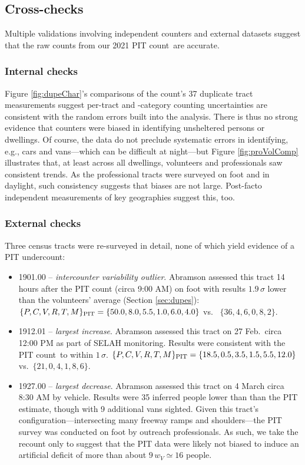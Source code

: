 \documentclass[11pt,twocolumn]{article}
\def\Count{count}
\begin{document}
\subsection{Cross-checks}
\label{sec:crossChecks}

Multiple validations involving independent counters and external datasets suggest 
that the raw counts from our 2021 PIT \Count\ are accurate.

\subsubsection{Internal checks}

Figure \ref{fig:dupeChar}'s comparisons of the count's 37 duplicate tract measurements suggest 
per-tract and -category counting uncertainties are consistent with the random errors built into the analysis. 
There is thus no strong evidence that counters were biased in identifying unsheltered persons or dwellings. 
Of course, the data do not preclude systematic errors in identifying, e.g., cars and 
vans---which can be difficult at night---but Figure \ref{fig:proVolComp} illustrates that, at least across all
dwellings, volunteers and professionals saw consistent trends. As the professional tracts were surveyed 
on foot and in daylight, such consistency suggests that biases are not large. Post-facto independent 
measurements of key geographies suggest this, too.

\subsubsection{External checks}

Three census tracts were re-surveyed in detail, none of which yield evidence of a PIT undercount:
\begin{itemize}
	\item 1901.00 -- {\it intercounter variability outlier}. Abramson
		  assessed this tract 14 hours after the PIT count (circa 9:00 AM) on foot with results 
		  $1.9\,\sigma$ lower than the volunteers' average (Section \ref{sec:dupes}):
		  $\{P,C,V,R,T,M\}_{\rm PIT} = \{50.0, 8.0, 5.5, 1.0, 6.0, 4.0\}$ vs.~
		$\{36, 4, 6, 0, 8, 2\}$.
	\item 1912.01 -- {\it largest increase}. Abramson assessed this tract on 
		27 Feb.\ circa 12:00 PM as part of SELAH monitoring. Results were consistent with 
		the PIT \Count\ to within $1\,\sigma$. $\{P,C,V,R,T,M\}_{\rm PIT}=\{18.5,0.5, 3.5, 1.5, 5.5, 12.0\}$ 
		vs.~$\{21,0,4,1,8,6\}$.
	\item 1927.00 -- {\it largest decrease}. Abramson assessed this tract
		on 4 March circa 8:30 AM by vehicle. Results were 35 inferred people lower than than the PIT 
		estimate, though with 9 additional vans sighted. Given this tract's configuration---intersecting 
		many freeway ramps and shoulders---the PIT survey was conducted on foot by outreach professionals. 
		As such, we take the recount only to suggest that the PIT data were likely not biased to induce an 
		artificial deficit of more than about $9\,w_{V}\simeq 16$ people.
\end{itemize}
\end{document}
